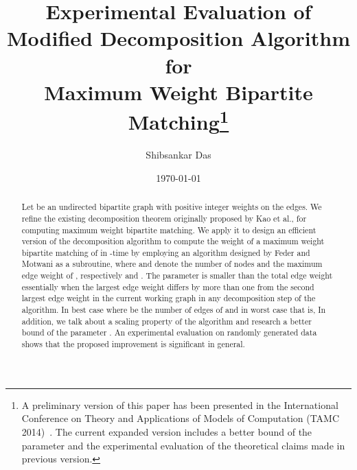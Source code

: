 \documentclass[runningheads,a4paper]{llncs}
\begin{document}
\mainmatter

\title{Experimental Evaluation of\\Modified Decomposition Algorithm for\\Maximum Weight Bipartite Matching\thanks{A preliminary version of this paper has been presented in the  International Conference on Theory and Applications of Models of Computation (TAMC 2014)~\cite{das14}. The current expanded version includes a better bound of the parameter  and the experimental evaluation of the theoretical claims made in previous version.}}




\author{Shibsankar Das}


\date{\today}


\maketitle              

\begin{abstract}
Let  be an undirected bipartite graph with 
positive integer weights
on the edges. We refine the existing decomposition
theorem originally proposed by Kao et al., for computing
maximum weight bipartite matching. We apply it to design an efficient version of the decomposition algorithm to compute the weight of
a maximum weight bipartite matching of  in -time
by employing an algorithm designed by Feder and Motwani as a subroutine, 
where  and   denote the number of nodes and
the maximum edge weight of , respectively and .
The parameter  is smaller than the total edge weight  
essentially when the largest edge weight differs by more than one from the second largest edge weight in the current working graph in any decomposition step of the algorithm. In best case  where  be the number of edges of  and 
in worst case  that is, 
In addition, we talk about a scaling property of the algorithm and research a better bound of the parameter . 
An experimental evaluation on randomly generated data shows that the proposed improvement is significant in general.

\end{abstract}
\end{document}
